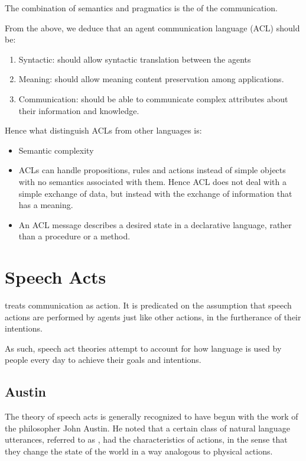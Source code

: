 The combination of semantics and pragmatics is the  of the communication.

From the above, we deduce that an agent communication language (ACL) should be:
\begin{enumerate}
\item Syntactic: should allow syntactic translation between the agents
\item Meaning: should allow meaning content preservation among applications.
\item Communication: should be able to communicate complex attributes about their information and knowledge.
\end{enumerate}
Hence what distinguish ACLs from other languages is:
\begin{itemize}
\item Semantic complexity
\item ACLs can handle propositions, rules and actions instead of simple objects with no semantics associated with them. Hence ACL does not deal with a simple exchange of data, but instead with the exchange of information that has a meaning.
\item An ACL message describes a desired state in a declarative language, rather than a procedure or a method. 
\end{itemize}


\section{Speech Acts}
\phantom{c} treats communication as action. It is predicated on the assumption that speech actions are performed by agents just like other actions, in the furtherance of their intentions.

As such, speech act theories attempt to account for how language is used by people every day to achieve their goals and intentions. 

\subsection{Austin}
The theory of speech acts is generally recognized to have begun with the work of the philosopher John Austin. He noted that a certain class of natural language utterances, referred to as , had the characteristics of actions, in the sense that they change the state of the world in a way analogous to physical actions.


